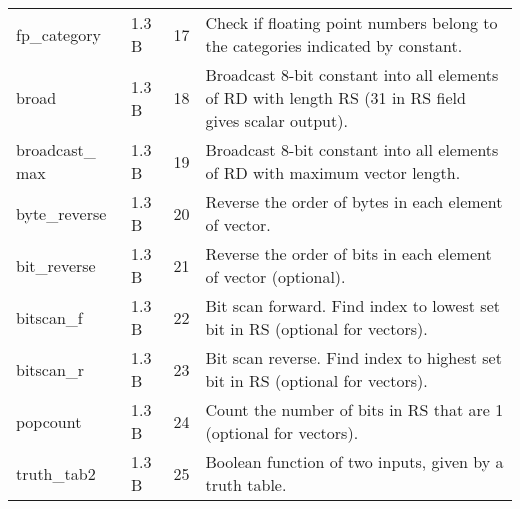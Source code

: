 \documentclass[forwardcom.tex]{subfiles}
\begin{document}
\begin{longtable} {|p{20mm}|p{10mm}|p{8mm}|p{75mm}|}
fp\_category  & 1.3 B & 17 & Check if floating point numbers belong to the categories indicated by constant. \\

broad         & 1.3 B & 18 & Broadcast 8-bit constant into all elements of RD with length RS (31 in RS field gives scalar output). \\

broadcast\_ max & 1.3 B & 19 & Broadcast 8-bit constant into all elements of RD with maximum vector length. \\

byte\_reverse & 1.3 B & 20 & Reverse the order of bytes in each element of vector. \\
bit\_reverse  & 1.3 B & 21 & Reverse the order of bits in each element of vector (optional). \\

bitscan\_f    & 1.3 B & 22 & Bit scan forward. Find index to lowest set bit in RS (optional for vectors). \\
bitscan\_r    & 1.3 B & 23 & Bit scan reverse. Find index to highest set bit in RS (optional for vectors). \\
popcount      & 1.3 B & 24 & Count the number of bits in RS that are 1 (optional for vectors). \\
truth\_tab2   & 1.3 B & 25 & Boolean function of two inputs, given by a truth table. \\


\end{longtable}
\end{document}
